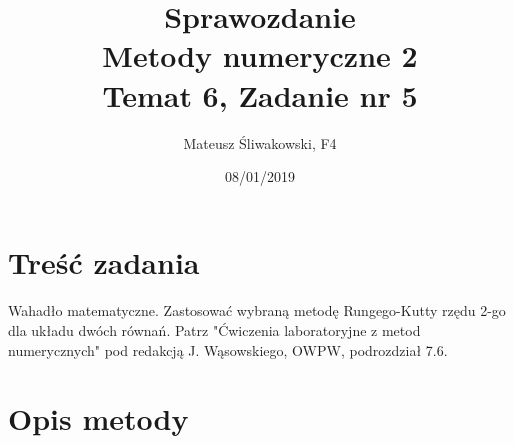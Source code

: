 \documentclass{article}
\title{Sprawozdanie \\Metody numeryczne 2 \\\textbf{Temat 6, Zadanie nr 5}}
\date{08/01/2019}
\author{Mateusz Śliwakowski, F4}
\begin{document}
  \maketitle
 	  \newpage

\section{Treść zadania}
\paragraph{}
Wahadło matematyczne. Zastosować wybraną metodę Rungego-Kutty rzędu 2-go dla układu dwóch równań. Patrz "Ćwiczenia laboratoryjne z metod numerycznych" pod redakcją J. Wąsowskiego, OWPW, podrozdział 7.6.
\section{Opis metody}
\end{document}

